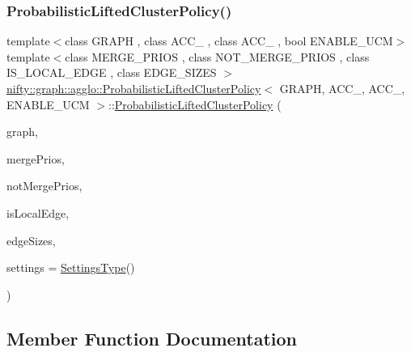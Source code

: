 \subsubsection{\texorpdfstring{Probabilistic\+Lifted\+Cluster\+Policy()}{ProbabilisticLiftedClusterPolicy()}}
{\footnotesize\ttfamily template$<$class G\+R\+A\+PH , class A\+C\+C\+\_ , class A\+C\+C\+\_ , bool E\+N\+A\+B\+L\+E\+\_\+\+U\+CM$>$ \\
template$<$class M\+E\+R\+G\+E\+\_\+\+P\+R\+I\+OS , class N\+O\+T\+\_\+\+M\+E\+R\+G\+E\+\_\+\+P\+R\+I\+OS , class I\+S\+\_\+\+L\+O\+C\+A\+L\+\_\+\+E\+D\+GE , class E\+D\+G\+E\+\_\+\+S\+I\+Z\+ES $>$ \\
\hyperlink{classnifty_1_1graph_1_1agglo_1_1ProbabilisticLiftedClusterPolicy}{nifty\+::graph\+::agglo\+::\+Probabilistic\+Lifted\+Cluster\+Policy}$<$ G\+R\+A\+PH, A\+C\+C\+\_, A\+C\+C\+\_, E\+N\+A\+B\+L\+E\+\_\+\+U\+CM $>$\+::\hyperlink{classnifty_1_1graph_1_1agglo_1_1ProbabilisticLiftedClusterPolicy}{Probabilistic\+Lifted\+Cluster\+Policy} (\begin{DoxyParamCaption}\item[{const \hyperlink{classnifty_1_1graph_1_1agglo_1_1ProbabilisticLiftedClusterPolicy_a196d3d530d5eed9f8a40172dcd93fa41}{Graph\+Type} \&}]{graph,  }\item[{const M\+E\+R\+G\+E\+\_\+\+P\+R\+I\+OS \&}]{merge\+Prios,  }\item[{const N\+O\+T\+\_\+\+M\+E\+R\+G\+E\+\_\+\+P\+R\+I\+OS \&}]{not\+Merge\+Prios,  }\item[{const I\+S\+\_\+\+L\+O\+C\+A\+L\+\_\+\+E\+D\+GE \&}]{is\+Local\+Edge,  }\item[{const E\+D\+G\+E\+\_\+\+S\+I\+Z\+ES \&}]{edge\+Sizes,  }\item[{const \hyperlink{structnifty_1_1graph_1_1agglo_1_1ProbabilisticLiftedClusterPolicy_1_1SettingsType}{Settings\+Type} \&}]{settings = {\ttfamily \hyperlink{structnifty_1_1graph_1_1agglo_1_1ProbabilisticLiftedClusterPolicy_1_1SettingsType}{Settings\+Type}()} }\end{DoxyParamCaption})\hspace{0.3cm}{\ttfamily [inline]}}



\subsection{Member Function Documentation}
\mbox{\label{classnifty_1_1graph_1_1agglo_1_1ProbabilisticLiftedClusterPolicy_af8383e3011d7d3c895edc482c188e513}} 
